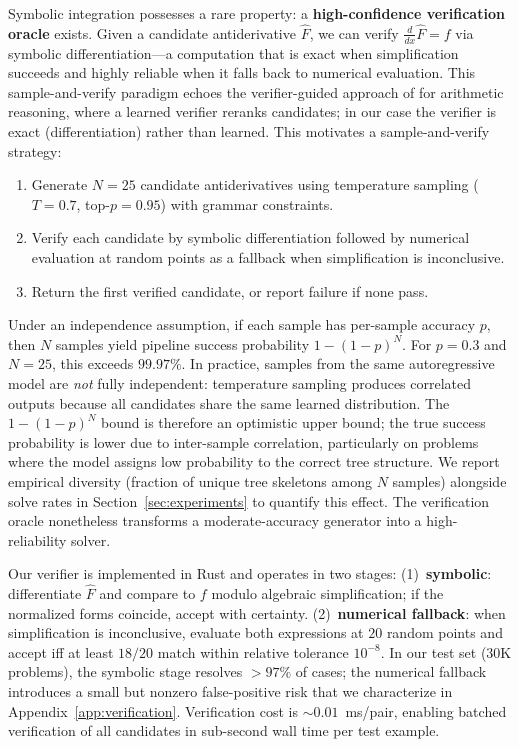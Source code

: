 \documentclass{article}
\begin{document}
Symbolic integration possesses a rare property: a \textbf{high-confidence
	verification oracle} exists. Given a candidate antiderivative $\hat{F}$,
we can verify $\tfrac{d}{dx}\hat{F} = f$ via symbolic differentiation---a
computation that is exact when simplification succeeds and highly reliable
when it falls back to numerical evaluation. This sample-and-verify paradigm
echoes the verifier-guided approach of \citet{cobbe2021training} for
arithmetic reasoning, where a learned verifier reranks candidates; in our
case the verifier is exact (differentiation) rather than learned. This
motivates a sample-and-verify strategy:
\begin{enumerate}
	\item Generate $N\!=\!25$ candidate antiderivatives using temperature
	      sampling ($T\!=\!0.7$, top-$p\!=\!0.95$) with grammar constraints.
	\item Verify each candidate by symbolic differentiation followed by
	      numerical evaluation at random points as a fallback when
	      simplification is inconclusive.
	\item Return the first verified candidate, or report failure if none
	      pass.
\end{enumerate}
Under an independence assumption, if each sample has per-sample accuracy
$p$, then $N$ samples yield pipeline success probability $1 - (1-p)^N$.
For $p = 0.3$ and $N = 25$, this exceeds $99.97\%$. In practice, samples
from the same autoregressive model are \emph{not} fully independent:
temperature sampling produces correlated outputs because all candidates
share the same learned distribution. The $1-(1-p)^N$ bound is therefore
an optimistic upper bound; the true success probability is lower due to
inter-sample correlation, particularly on problems where the model assigns
low probability to the correct tree structure. We report empirical
diversity (fraction of unique tree skeletons among $N$ samples) alongside
solve rates in Section~\ref{sec:experiments} to quantify this effect.
The verification oracle nonetheless transforms a moderate-accuracy
generator into a high-reliability solver.

Our verifier is implemented in Rust and operates in two stages:
(1)~\textbf{symbolic}: differentiate $\hat{F}$ and compare to $f$ modulo
algebraic simplification; if the normalized forms coincide, accept with
certainty. (2)~\textbf{numerical fallback}: when simplification is
inconclusive, evaluate both expressions at $20$ random points and accept
iff at least $18/20$ match within relative tolerance $10^{-8}$.
In our test set ($30$K problems), the symbolic stage resolves $>97\%$ of
cases; the numerical fallback introduces a small but nonzero false-positive
risk that we characterize in Appendix~\ref{app:verification}.
Verification cost is $\sim\!0.01$~ms/pair, enabling batched verification
of all candidates in sub-second wall time per test example.
\end{document}
